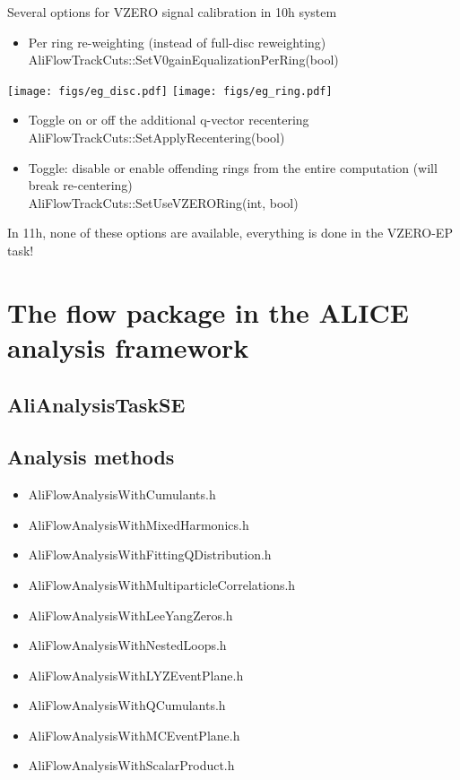 \documentclass[a4paper]{book}
\numberwithin{equation}{subsection}
\begin{document}
Several options for VZERO signal calibration in 10h system
\begin{itemize}
\item Per ring re-weighting (instead of full-disc reweighting) \\
\alert{AliFlowTrackCuts::SetV0gainEqualizationPerRing(bool)}
\end{itemize}
\begin{center}
\texttt{[image: figs/eg\_disc.pdf]}
\texttt{[image: figs/eg\_ring.pdf]}
\end{center}
\begin{itemize}
\item Toggle on or off the additional q-vector recentering \\
AliFlowTrackCuts::SetApplyRecentering(bool)
\item Toggle: disable or enable offending rings from the entire computation (will break re-centering) \\
AliFlowTrackCuts::SetUseVZERORing(int, bool)
\end{itemize}
In 11h, none of these options are available, \alert{everything is done in the VZERO-EP task}!


\section{The flow package in the ALICE analysis framework}
\subsection{AliAnalysisTaskSE}
\subsection{Analysis methods}

\begin{itemize}
\item AliFlowAnalysisWithCumulants.h             
\item AliFlowAnalysisWithMixedHarmonics.h
\item AliFlowAnalysisWithFittingQDistribution.h \item  AliFlowAnalysisWithMultiparticleCorrelations.h
\item AliFlowAnalysisWithLeeYangZeros.h          
\item AliFlowAnalysisWithNestedLoops.h
\item AliFlowAnalysisWithLYZEventPlane.h         
\item AliFlowAnalysisWithQCumulants.h
\item AliFlowAnalysisWithMCEventPlane.h          
\item AliFlowAnalysisWithScalarProduct.h
\end{itemize}
\end{document}
